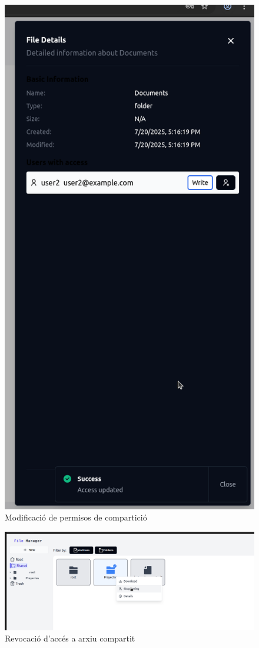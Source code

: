 \begin{figure}[H]
\centering
\includegraphics[width=0.8\linewidth]{Figures/implementacio/sharedFileUpdate.png}
\caption{Modificació de permisos de compartició}
\label{fig:sharedFileUpdate}
\end{figure}

\begin{figure}[H]
\centering
\includegraphics[width=0.7\linewidth]{Figures/implementacio/stopSeeing.png}
\caption{Revocació d'accés a arxiu compartit}
\label{fig:stopSeeing}
\end{figure}


